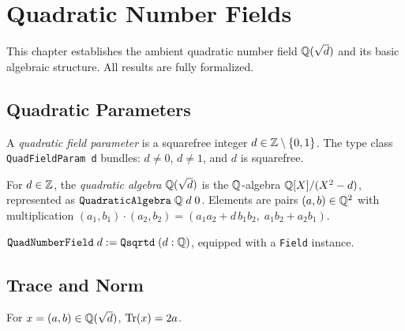 \chapter{Quadratic Number Fields}\label{ch:quadratic-field}

This chapter establishes the ambient quadratic number field $\mathbb{Q}(\sqrt{d})$
and its basic algebraic structure.  All results are fully formalized.

\section{Quadratic Parameters}

\begin{definition}\label{def:quad_field_param}
  \leanok
  A \emph{quadratic field parameter} is a squarefree integer
  $d\in\mathbb{Z}\setminus\{0,1\}$.
  The type class \texttt{QuadFieldParam\,d} bundles:
  $d\ne 0$, $d\ne 1$, and $d$ is squarefree.
\end{definition}

\begin{definition}\label{def:qsqrtd}
  \leanok
  For $d\in\mathbb{Z}$, the \emph{quadratic algebra} $\mathbb{Q}(\sqrt{d})$ is the
  $\mathbb{Q}$-algebra $\mathbb{Q}[X]/(X^2-d)$, represented as
  $\texttt{QuadraticAlgebra}\;\mathbb{Q}\;d\;0$.
  Elements are pairs $(a,b)\in\mathbb{Q}^2$ with multiplication
  $(a_1,b_1)\cdot(a_2,b_2) = (a_1 a_2 + d\,b_1 b_2,\;
  a_1 b_2 + a_2 b_1)$.
\end{definition}

\begin{definition}\label{def:quad_number_field}
  \leanok
  $\texttt{QuadNumberField}\;d := \texttt{Qsqrtd}\;(d:\mathbb{Q})$,
  equipped with a \texttt{Field} instance.
\end{definition}

\section{Trace and Norm}

\begin{lemma}\label{lem:trace_eq_two_re}
  \leanok
  For $x = (a,b)\in\mathbb{Q}(\sqrt{d})$, $\operatorname{Tr}(x) = 2a$.
\end{lemma}

